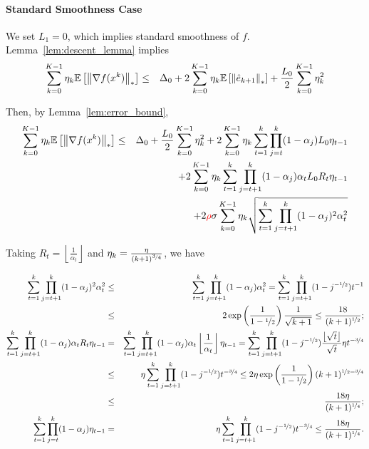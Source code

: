 \documentclass{article}
\begin{document}
\paragraph{Standard Smoothness Case} We set $L_1 = 0$, which implies standard smoothness of $f$. Lemma~\ref{lem:descent_lemma} implies 
\begin{eqnarray*}
    \sum_{k=0}^{K-1} \eta_k {\mathbb{E}}\left[\left\| \nabla f(x^k) \right\|_*\right] &\le& \Delta_0 + 2\sum^{K-1}_{k=0}\eta_k{\mathbb{E}}\left[\left\| \hat{e}_{k+1} \right\|_*\right] +\frac{L_0}{2}\sum^{K-1}_{k=0}\eta_k^2
\end{eqnarray*}

Then, by Lemma~\ref{lem:error_bound}, 
\begin{eqnarray*}
    \sum_{k=0}^{K-1} \eta_k {\mathbb{E}}\left[\left\| \nabla f(x^k) \right\|_*\right] &\le& \Delta_0  +\frac{L_0}{2}\sum^{K-1}_{k=0}\eta_k^2 + 2\sum^{K-1}_{k=0}\eta_k\sum_{t=1}^k \prod_{j=t}^{k}(1-\alpha_j) L_0\eta_{t-1}\\
    && + 2\sum^{K-1}_{k=0}\eta_k\sum_{t=1}^k \prod_{j=t+1}^{k}(1-\alpha_j) \alpha_t L_0 R_t\eta_{t-1}\\
    && + 2{\color{red} \rho} \sigma\sum^{K-1}_{k=0}\eta_k\sqrt{\sum_{t=1}^k \prod_{j=t+1}^{k}(1-\alpha_j)^2 \alpha_t^2}
\end{eqnarray*}

Taking $R_t = \left\lfloor\frac{1}{\alpha_t}\right\rfloor$ and $\eta_k = \frac{\eta}{(k+1)^{\nicefrac{3}{4}}}$, we have 

\begin{eqnarray*}
    \sum_{t=1}^k \prod_{j=t+1}^{k}(1-\alpha_j)^2 \alpha_t^2 &\le& \sum_{t=1}^k \prod_{j=t+1}^{k}(1-\alpha_j) \alpha_t^2 =  \sum_{t=1}^k \prod_{j=t+1}^{k}(1-j^{-\nicefrac{1}{2}}) t^{-1}\\
    &\le& 2\exp\left(\frac{1}{1-\nicefrac{1}{2}}\right) \frac{1}{\sqrt{k+1}} \le \frac{18}{(k+1)^{\nicefrac{1}{2}}};\\
    \sum_{t=1}^k \prod_{j=t+1}^{k}(1-\alpha_j) \alpha_t  R_t\eta_{t-1} &=& \sum_{t=1}^k \prod_{j=t+1}^{k}(1-\alpha_j) \alpha_t \left\lfloor\frac{1}{\alpha_t}\right\rfloor\eta_{t-1} = \sum_{t=1}^k \prod_{j=t+1}^{k}(1-j^{-\nicefrac{1}{2}}) \frac{\left\lfloor\sqrt{t}\right\rfloor}{\sqrt{t}} \eta t^{-\nicefrac{3}{4}}\\
    &\le& \eta \sum_{t=1}^k \prod_{j=t+1}^{k}(1-j^{-\nicefrac{1}{2}})  t^{-\nicefrac{3}{4}} \le 2\eta\exp\left(\frac{1}{1-\nicefrac{1}{2}}\right) (k+1)^{\nicefrac{1}{2} - \nicefrac{3}{4}}\\
    &\le& \frac{18\eta}{(k+1)^{\nicefrac{1}{4}}};\\
    \sum_{t=1}^k \prod_{j=t}^{k}(1-\alpha_j)\eta_{t-1} &=& \eta \sum_{t=1}^k \prod_{j=t+1}^{k}(1-j^{-\nicefrac{1}{2}})  t^{-\nicefrac{3}{4}}
    \le  \frac{18\eta}{(k+1)^{\nicefrac{1}{4}}}.
\end{eqnarray*}
\end{document}
